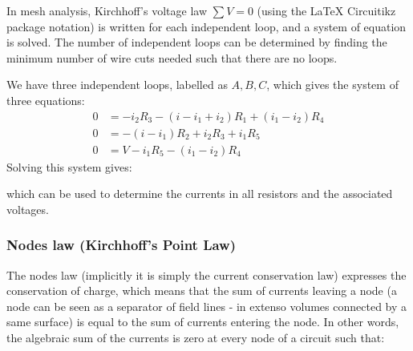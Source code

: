 	In mesh analysis, Kirchhoff's voltage law $\sum V = 0$ (using the \LaTeX{} Circuitikz package notation) is written for each independent loop, and a system of equation is solved. The number of independent loops can be determined by finding the minimum number of wire cuts needed such that there are no loops.
   \begin{center}
    \end{center}
    We have three independent loops, labelled as $A,B,C$, which gives the system of three equations:
    \begin{align}
        0 &= -i_2R_3-(i-i_1+i_2)R_1+(i_1-i_2)R_4 \\ 
        0 &= -(i-i_1)R_2 + i_2R_3 + i_1R_5 \\ 
        0 &= V - i_1R_5 - (i_1-i_2)R_4
    \end{align}
    Solving this system gives:
    
    which can be used to determine the currents in all resistors and the associated voltages.
	
	\subsubsection{Nodes law (Kirchhoff's Point Law)}
	The nodes law (implicitly it is simply the current conservation law) expresses the conservation of charge, which means that the sum of currents leaving a node (a node can be seen as a separator of field lines - in extenso volumes connected by a same surface) is equal to the sum of currents entering the node. In other words, the algebraic sum of the currents is zero at every node of a circuit such that:
	
